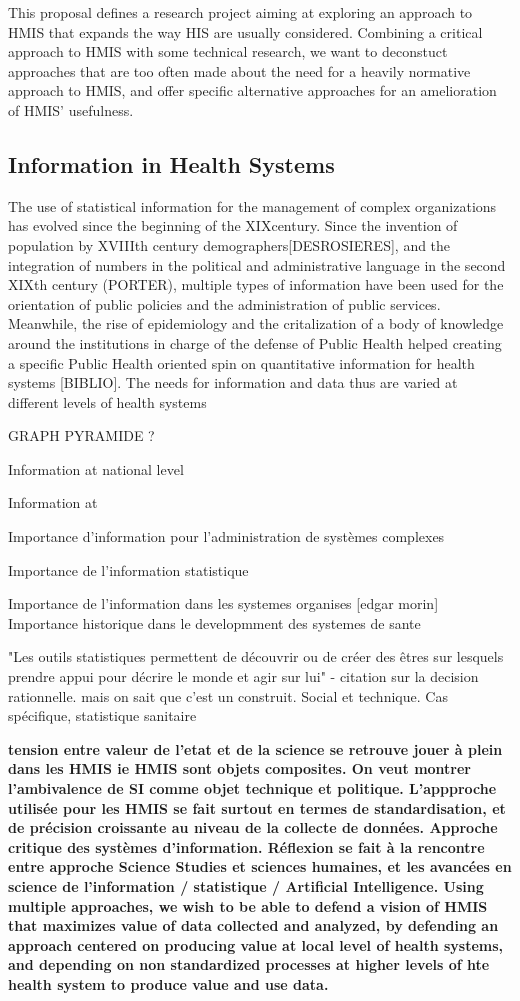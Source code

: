 \documentclass[a4paper,11pt,final,twoside]{article}
\begin{document}
This proposal defines a research project aiming at exploring an approach to HMIS that expands the way HIS are usually considered. Combining a critical approach to HMIS with some technical research, we want to deconstuct approaches that are too often made about the need for a heavily normative approach to HMIS, and offer specific alternative approaches for an amelioration of HMIS' usefulness.

\subsection{Information in Health Systems}

The use of statistical information for the management of complex organizations has evolved since the beginning of the XIX\th century. Since the invention of population by XVIIIth century demographers[DESROSIERES], and the integration of numbers in the political and administrative language in the second XIXth century (PORTER), multiple types of information have been used for the orientation of public policies and the administration of public services. Meanwhile, the rise of epidemiology and the critalization of a body of knowledge around the institutions in charge of the defense of Public Health helped creating a specific Public Health oriented spin on quantitative information for health systems [BIBLIO]. The needs for information and data thus are varied at different levels of health systems

GRAPH PYRAMIDE ?

Information at national level

Information at

Importance d'information pour l'administration de systèmes complexes

Importance de l'information statistique

Importance de l'information dans les systemes organises [edgar morin]
Importance historique dans le developmment des systemes de sante


"Les outils statistiques permettent de découvrir ou de créer des êtres sur lesquels prendre appui pour décrire le monde et agir sur lui" - citation sur la decision rationnelle. mais on sait que c'est un construit. Social et technique. Cas spécifique, statistique sanitaire


\textbf{tension entre valeur de l'etat et de la science se retrouve jouer à plein dans les HMIS ie HMIS sont objets composites. On veut montrer l'ambivalence de SI comme objet technique et politique. L'appproche utilisée pour les HMIS se fait surtout en termes de standardisation, et de précision croissante au niveau de la collecte de données. Approche critique des systèmes d'information. Réflexion se fait à la rencontre entre approche Science Studies et sciences humaines, et les avancées en science de l'information / statistique / Artificial Intelligence. Using multiple approaches, we wish to be able to defend a vision of HMIS that maximizes value of data collected and analyzed, by defending an approach centered on producing value at local level of health systems, and depending on non standardized processes at higher levels of hte health system to produce value and use data.}
\end{document}
